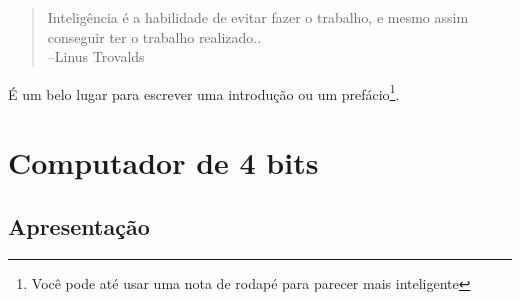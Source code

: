 \documentclass[oneside,11pt]{memoir} %
\begin{document}
\begin{quote}
Inteligência é a habilidade de evitar fazer o trabalho, e mesmo assim conseguir ter o trabalho realizado..\\
--Linus Trovalds
\end{quote}

É um belo lugar para escrever uma introdução ou um prefácio\footnote{Você pode até usar uma nota de rodapé para parecer mais inteligente}.


\part{Computador de 4 bits}


\chapter{Apresentação}
\end{document}
